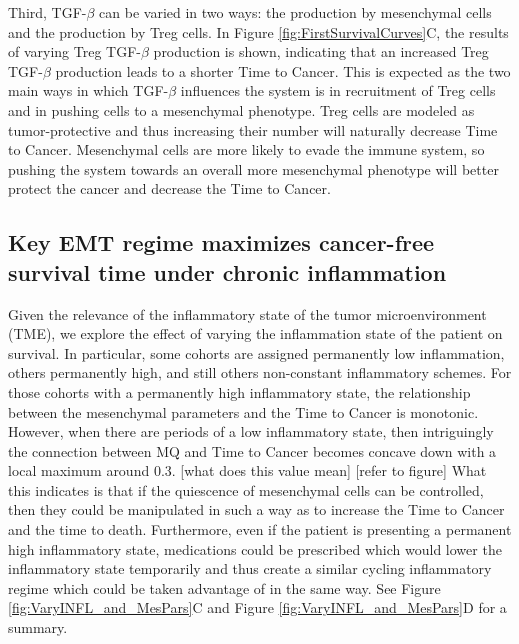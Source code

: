 \documentclass{article}
\begin{document}
Third, TGF-$\beta$ can be varied in two ways: the production by mesenchymal cells and the production by Treg cells.
In Figure \ref{fig:FirstSurvivalCurves}C, the results of varying Treg TGF-$\beta$ production is shown, indicating that an increased Treg TGF-$\beta$ production leads to a shorter Time to Cancer.
This is expected as the two main ways in which TGF-$\beta$ influences the system is in recruitment of Treg cells and in pushing cells to a mesenchymal phenotype.
Treg cells are modeled as tumor-protective and thus increasing their number will naturally decrease Time to Cancer.
Mesenchymal cells are more likely to evade the immune system, so pushing the system towards an overall more mesenchymal phenotype will better protect the cancer and decrease the Time to Cancer.

\subsection{Key EMT regime maximizes cancer-free survival time under chronic inflammation}\label{KeyEMT}
Given the relevance of the inflammatory state of the tumor microenvironment (TME), we explore the effect of varying the inflammation state of the patient on survival.
In particular, some cohorts are assigned permanently low inflammation, others permanently high, and still others non-constant inflammatory schemes.
For those cohorts with a permanently high inflammatory state, the relationship between the mesenchymal parameters and the Time to Cancer is monotonic.
However, when there are periods of a low inflammatory state, then intriguingly the connection between MQ and Time to Cancer becomes concave down with a local maximum around 0.3. [what does this value mean] [refer to figure]
What this indicates is that if the quiescence of mesenchymal cells can be controlled, then they could be manipulated in such a way as to increase the Time to Cancer and the time to death.
Furthermore, even if the patient is presenting a permanent high inflammatory state, medications could be prescribed which would lower the inflammatory state temporarily and thus create a similar cycling inflammatory regime which could be taken advantage of in the same way.
See Figure \ref{fig:VaryINFL_and_MesPars}C and Figure \ref{fig:VaryINFL_and_MesPars}D for a summary.
\end{document}
